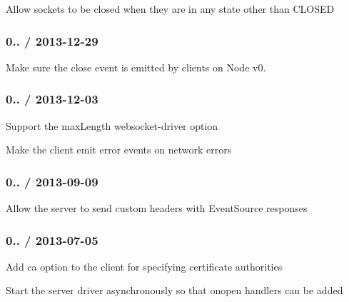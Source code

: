 \begin{DoxyItemize}
\item Allow sockets to be closed when they are in any state other than {\ttfamily C\+L\+O\+S\+ED}
\end{DoxyItemize}

\subsubsection*{0.. / 2013-\/12-\/29}


\begin{DoxyItemize}
\item Make sure the {\ttfamily close} event is emitted by clients on Node v0.
\end{DoxyItemize}

\subsubsection*{0.. / 2013-\/12-\/03}


\begin{DoxyItemize}
\item Support the {\ttfamily max\+Length} websocket-\/driver option
\item Make the client emit {\ttfamily error} events on network errors
\end{DoxyItemize}

\subsubsection*{0.. / 2013-\/09-\/09}


\begin{DoxyItemize}
\item Allow the server to send custom headers with Event\+Source responses
\end{DoxyItemize}

\subsubsection*{0.. / 2013-\/07-\/05}


\begin{DoxyItemize}
\item Add {\ttfamily ca} option to the client for specifying certificate authorities
\item Start the server driver asynchronously so that {\ttfamily onopen} handlers can be added
\end{DoxyItemize}

